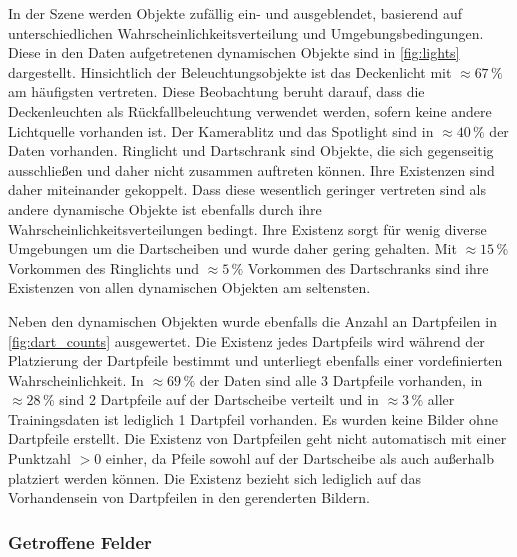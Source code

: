 In der Szene werden Objekte zufällig ein- und ausgeblendet, basierend auf unterschiedlichen Wahrscheinlichkeitsverteilung und Umgebungsbedingungen. Diese in den Daten aufgetretenen dynamischen Objekte sind in \autoref{fig:lights} dargestellt. Hinsichtlich der Beleuchtungsobjekte ist das Deckenlicht mit $\approx67\,\%$ am häufigsten vertreten. Diese Beobachtung beruht darauf, dass die Deckenleuchten als Rückfallbeleuchtung verwendet werden, sofern keine andere Lichtquelle vorhanden ist. Der Kamerablitz und das Spotlight sind in $\approx40\,\%$ der Daten vorhanden. Ringlicht und Dartschrank sind Objekte, die sich gegenseitig ausschließen und daher nicht zusammen auftreten können. Ihre Existenzen sind daher miteinander gekoppelt. Dass diese wesentlich geringer vertreten sind als andere dynamische Objekte ist ebenfalls durch ihre Wahrscheinlichkeitsverteilungen bedingt. Ihre Existenz sorgt für wenig diverse Umgebungen um die Dartscheiben und wurde daher gering gehalten. Mit $\approx15\,\%$ Vorkommen des Ringlichts und $\approx5\,\%$ Vorkommen des Dartschranks sind ihre Existenzen von allen dynamischen Objekten am seltensten.

Neben den dynamischen Objekten wurde ebenfalls die Anzahl an Dartpfeilen in \autoref{fig:dart_counts} ausgewertet. Die Existenz jedes Dartpfeils wird während der Platzierung der Dartpfeile bestimmt und unterliegt ebenfalls einer vordefinierten Wahrscheinlichkeit. In $\approx69\,\%$ der Daten sind alle 3 Dartpfeile vorhanden, in $\approx28\,\%$ sind 2 Dartpfeile auf der Dartscheibe verteilt und in $\approx3\,\%$ aller Trainingsdaten ist lediglich 1 Dartpfeil vorhanden. Es wurden keine Bilder ohne Dartpfeile erstellt. Die Existenz von Dartpfeilen geht nicht automatisch mit einer Punktzahl $>0$ einher, da Pfeile sowohl auf der Dartscheibe als auch außerhalb platziert werden können. Die Existenz bezieht sich lediglich auf das Vorhandensein von Dartpfeilen in den gerenderten Bildern.

\subsubsection{Getroffene Felder}
\label{sec:felder_ergebnisse}

